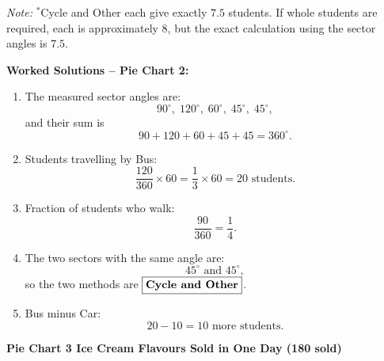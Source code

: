 \documentclass[a4paper,12pt]{article}
\newcommand{\ans}[1]{\fbox{\textbf{#1}}}
\begin{document}
\vspace{4pt}
\noindent\textit{Note:} \(^*\)Cycle and Other each give exactly \(7.5\) students. If whole students are required, each is approximately \(8\), but the exact calculation using the sector angles is \(7.5\).

\vspace{4pt}
\noindent\textbf{Worked Solutions -- Pie Chart 2:}
\begin{enumerate}[leftmargin=1.6em, itemsep=4pt]
  \item The measured sector angles are:
        \[
        90^\circ,\;120^\circ,\;60^\circ,\;45^\circ,\;45^\circ,
        \]
        and their sum is
        \[
        90+120+60+45+45=360^\circ.
        \]

  \item Students travelling by Bus:
        \[
        \frac{120}{360}\times 60
        =\frac13\times 60
        =\boxed{20\text{ students}}.
        \]

  \item Fraction of students who walk:
        \[
        \frac{90}{360}=\boxed{\frac14}.
        \]

  \item The two sectors with the same angle are:
        \[
        45^\circ\text{ and }45^\circ,
        \]
        so the two methods are \(\ans{Cycle and Other}\).

  \item Bus minus Car:
        \[
        20-10=\boxed{10\text{ more students}}.
        \]
\end{enumerate}

\newpage

\begin{center}
  {\large\bfseries Pie Chart 3 \textendash{} Ice Cream Flavours Sold in One Day (180 sold)}
\end{center}
\end{document}
